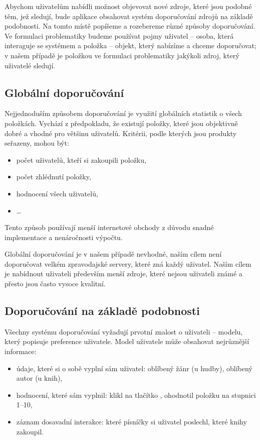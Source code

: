 Abychom uživatelům nabídli možnost objevovat nové zdroje, které jsou podobné těm, jež sledují, bude aplikace obsahovat systém doporučování zdrojů na základě podobnosti.
Na tomto místě popíšeme a rozebereme různé způsoby doporučování.
Ve formulaci problematiky budeme používat pojmy uživatel -- osoba, která interaguje se systémem a položka -- objekt, který nabízíme a chceme doporučovat; v našem případě je položkou ve formulaci problematiky jakýkoli zdroj, který uživatelé sledují.

\subsection{Globální doporučování}

Nejjednoduším způsobem doporučování je využití globálních statistik o všech položkách.
Vychází z předpokladu, že existují položky, které jsou objektivně dobré a vhodné pro většinu uživatelů.
Kritérii, podle kterých jsou produkty seřazeny, mohou být:
\begin{itemize}
	\item počet uživatelů, kteří si zakoupili položku,
	\item počet zhlédnutí položky,
	\item hodnocení všech uživatelů,
	\item \ldots
\end{itemize}
Tento způsob používají menší internetové obchody z důvodu snadné implementace a nenáročnosti výpočtu.

Globální doporučování je v našem případě nevhodné, naším cílem není doporučovat velkém zpravodajské servery, které zná každý uživatel.
Naším cílem je nabídnout uživateli především menší zdroje, které nejsou uživateli známé a přesto jsou často vysoce kvalitní.

\subsection{Doporučování na základě podobnosti}

Všechny systému doporučování vyžadují prvotní znalost o uživateli -- modelu, který popisuje preference uživatele.
Model uživatele může obsahovat nejrůznější informace:
\begin{itemize}
	\item údaje, které si o sobě vyplní sám uživatel: oblíbený žánr (u hudby), oblíbený autor (u knih),
	\item hodnocení, které sám vyplnil: klikl na tlačítko , ohodnotil položku na stupnici 1--10,
	\item záznam dosavadní interakce: které písníčky si uživatel poslechl, které knihy zakoupil.
\end{itemize}


